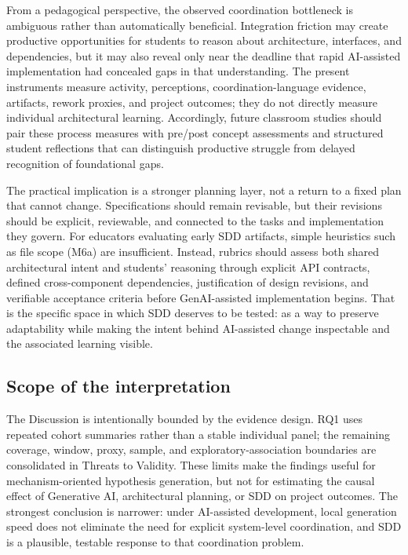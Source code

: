 From a pedagogical perspective, the observed coordination bottleneck is
ambiguous rather than automatically beneficial. Integration friction may
create productive opportunities for students to reason about architecture,
interfaces, and dependencies, but it may also reveal only near the deadline
that rapid AI-assisted implementation had concealed gaps in that
understanding. The present instruments measure activity, perceptions,
coordination-language evidence, artifacts, rework proxies, and project
outcomes; they do not directly measure individual architectural learning.
Accordingly, future classroom studies should pair these process measures with
pre/post concept assessments and structured student reflections that can
distinguish productive struggle from delayed recognition of foundational
gaps.

The practical implication is a stronger planning layer, not a return to a
fixed plan that cannot change. Specifications should remain revisable, but
their revisions should be explicit, reviewable, and connected to the tasks and
implementation they govern. For educators evaluating early SDD artifacts,
simple heuristics such as file scope (M6a) are insufficient. Instead, rubrics
should assess both shared architectural intent and students' reasoning through
explicit API contracts, defined cross-component dependencies, justification
of design revisions, and verifiable acceptance criteria before GenAI-assisted
implementation begins. That is the specific space in which SDD deserves to be
tested: as a way to preserve adaptability while making the intent behind
AI-assisted change inspectable and the associated learning visible.

\subsection{Scope of the interpretation}

The Discussion is intentionally bounded by the evidence design. RQ1 uses
repeated cohort summaries rather than a stable individual panel; the remaining
coverage, window, proxy, sample, and exploratory-association boundaries are
consolidated in Threats to Validity. These limits make the findings useful for
mechanism-oriented hypothesis generation, but not for estimating the causal
effect of Generative AI, architectural planning, or SDD on project outcomes.
The strongest conclusion is narrower: under
AI-assisted development, local generation speed does not eliminate the need for
explicit system-level coordination, and SDD is a plausible, testable response
to that coordination problem.
